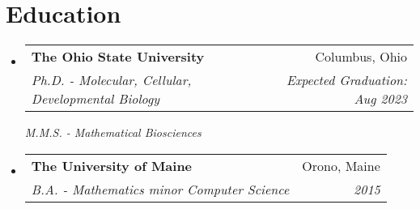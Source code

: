 \documentclass[letter,12pt]{article}
\makeatletter
\newcommand{\resumeItem}[2]{
  \item\small{
    \textbf{#1}{: #2 \vspace{-4pt}}
  }
}
\newcommand{\resumeSubheadingtwo}[4]{
  \vspace{-2pt}\item
    \begin{tabular*}{0.97\textwidth}{l@{\extracolsep{\fill}}r}
      \textbf{#1} & #2 \\
      \textit{#3} & \textit{#4} \\
    \end{tabular*}\vspace{-5pt}
}
\newcommand{\resumeSubheading}[2]{
  \vspace{-2pt}\item
    \begin{tabular*}{0.97\textwidth}{l@{\extracolsep{\fill}}r}
      \textbf{#1} & #2 \\
    \end{tabular*}\vspace{-6pt}
}
\newcommand{\resumeSubHeadingListStart}{\begin{itemize}[leftmargin=*]}
\newcommand{\resumeSubHeadingListEnd}{\end{itemize}}
\newcommand{\resumeItemListStart}{\begin{itemize}}
\newcommand{\resumeItemListEnd}{\end{itemize}\vspace{-5pt}}
\makeatother
\begin{document}
\vspace{-5pt}


\section{\textbf{Education}}
  \resumeSubHeadingListStart
     \resumeSubheadingtwo
      {The Ohio State University}{Columbus, Ohio}
      {Ph.D. - Molecular, Cellular, Developmental Biology}{Expected Graduation: Aug 2023}
      
      \textit{M.M.S. - Mathematical Biosciences}
    \resumeSubheadingtwo
      {The University of Maine}{Orono, Maine}
      {B.A. - Mathematics minor Computer Science}{2015}
    \resumeSubHeadingListEnd
\end{document}

